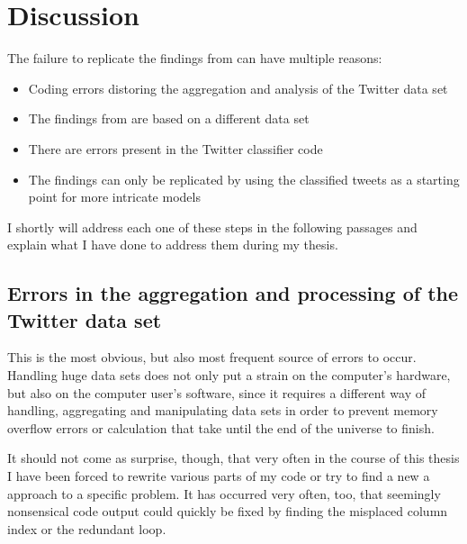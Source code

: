 \documentclass[11pt, a4paper,twoside]{report}\usepackage[]{graphicx}\usepackage[]{color}
\begin{document}
\thispagestyle{empty}
\cleardoublepage

\chapter{Discussion}
\label{ch:discussion}
The failure to replicate the findings from \citep{bodnar_data_2015} can have multiple reasons: 

\begin{itemize}
\item Coding errors distoring the aggregation and analysis of the Twitter data set
\item The findings from \citep{bodnar_data_2015} are based on a different data set
\item There are errors present in the Twitter classifier code
\item The findings can only be replicated by using the classified tweets as a starting point for more intricate models
\end{itemize}

I shortly will address each one of these steps in the following passages and explain what I have done to address them during my thesis. 

\section{Errors in the aggregation and processing of the Twitter data set}
This is the most obvious, but also most frequent source of errors to occur. Handling huge data sets does not only put a strain on the computer's hardware, but also on the computer user's software, since it requires a different way of handling, aggregating and manipulating data sets in order to prevent memory overflow errors or calculation that take until the end of the universe to finish.\newline

It should not come as surprise, though, that very often in the course of this thesis I have been forced to rewrite various parts of my code or try to find a new a approach to a specific problem. It has occurred very often, too, that seemingly nonsensical code output could quickly be fixed by finding the misplaced column index or the redundant loop.\newline
\end{document}
